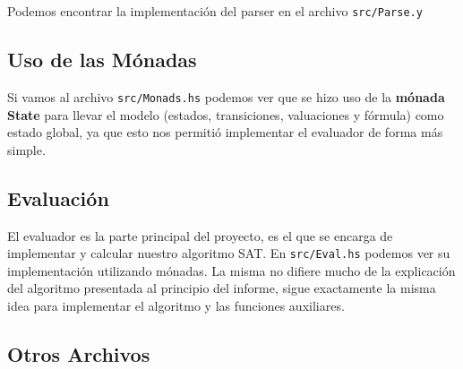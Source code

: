 \documentclass[11pt]{article}
\begin{document}
Podemos encontrar la implementación del parser en el archivo
\texttt{src/Parse.y}

\subsection{Uso de las Mónadas}

Si vamos al archivo \texttt{src/Monads.hs} podemos ver que se hizo
uso de la \textbf{mónada State} para llevar el modelo (estados,
transiciones, valuaciones y fórmula) como estado global, ya que esto
nos permitió implementar el evaluador de forma más simple.

\subsection{Evaluación}

El evaluador es la parte principal del proyecto, es el que se encarga
de implementar y calcular nuestro algoritmo SAT. En \texttt{src/Eval.hs}
podemos ver su implementación utilizando mónadas. La misma no difiere
mucho de la explicación del algoritmo presentada al principio del 
informe, sigue exactamente la misma idea para implementar el algoritmo
y las funciones auxiliares.

\subsection{Otros Archivos}
\end{document}
